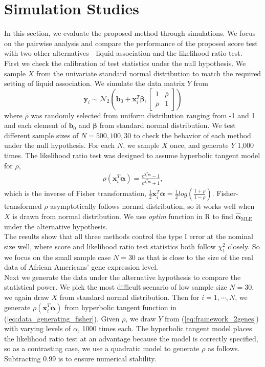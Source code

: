 \documentclass[aap,authoryear, preprint]{imsart}
\numberwithin{equation}{section}
\theoremstyle{plain}
\begin{document}
\section{Simulation Studies} \label{simulations}
In this section, we evaluate the proposed method through simulations. We focus on the pairwise analysis and compare the performance of the proposed score test with two other alternatives - liquid association and the likelihood ratio test. \\

First we check the calibration of test statistics under the null hypothesis. We sample $X$ from the univariate standard normal distribution to match the required setting of liquid association. We simulate the data matrix $Y$ from $$\bm{y}_i \sim \mathcal{N}_2\left(\bm{b}_0 + \bm{x}_i^T\bm{\beta}, \begin{bmatrix} 1 & \bar{\rho} \\ \bar{\rho} & 1 \end{bmatrix}  \right)$$ where $\bar{\rho}$ was randomly selected from uniform distribution ranging from -1 and 1 and each element of $\bm{b}_0$ and $\bm{\beta}$ from standard normal distribution. We test different sample sizes of $N = 500, 100, 30$ to check the behavior of each method under the null hypothesis. For each $N$, we sample $X$ once, and generate $Y$ 1,000 times. The likelihood ratio test was designed to assume hyperbolic tangent model for $\rho$,
\begin{align}
    \rho(\bm{x}_i^T\bm{\alpha}) = \frac{e^{\bm{x}_i^T\bm{\alpha}}-1}{e^{\bm{x}_i^T\bm{\alpha}}+1},
    \label{eq:data_generating_fisher}
\end{align}
which is the inverse of Fisher transformation, 
$\frac{1}{2} \bm{x}_i^T\bm{\alpha} = \frac{1}{2}log \left(\frac{1+\rho}{1-\rho}\right)$. Fisher-transformed $\rho$ asymptotically follows normal distribution, so it works well when $X$ is drawn from normal distribution. We use \textit{optim} function in R to find $\hat{\bm{\alpha}}_{\text{MLE}}$ under the alternative hypothesis. \\

The results show that all three methods control the type I error at the nominal size well, where score and likelihood ratio test statistics both follow $\chi_1^2$ closely. So we focus on the small sample case $N=30$ as that is close to the size of the real data of African Americans' gene expression level.\\

Next we generate the data under the alternative hypothesis to compare the statistical power. We pick the most difficult scenario of low sample size $N=30$, we again draw $X$ from standard normal distribution. Then for $i = 1, \cdots, N$, we generate $\rho(\bm{x}_i^T\bm{\alpha})$ from hyperbolic tangent function in (\ref{eq:data_generating_fisher}). Given $\rho$, we draw $Y$ from (\ref{eq:framework_2genes}) with varying levels of $\alpha$, 1000 times each. The hyperbolic tangent model places the likelihood ratio test at an advantage because the model is correctly specified, so as a contrasting case, we use a quadratic model to generate $\rho$ as follows. Subtracting 0.99 is to ensure numerical stability.
\end{document}
